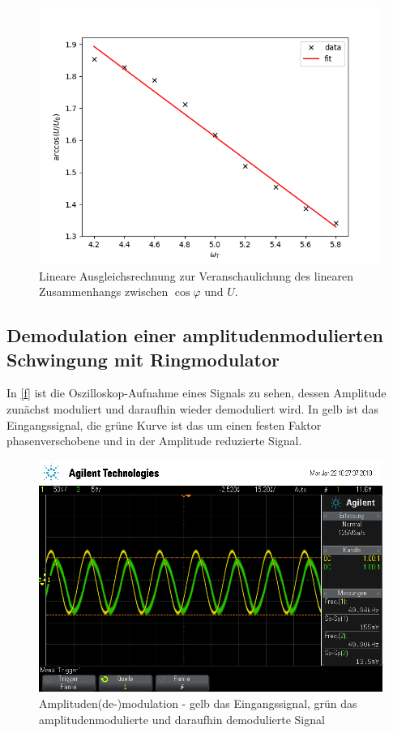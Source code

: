 \begin{figure}
	\centering
	\includegraphics[width=\textwidth]{img/linear_fit.png}
	\caption{Lineare Ausgleichsrechnung zur Veranschaulichung des linearen Zusammenhangs zwischen $\cos\varphi$ und $U$.}
	\label{fig:e}
\end{figure}

\subsection{Demodulation einer amplitudenmodulierten Schwingung mit Ringmodulator}

In \autoref{f} ist die Oszilloskop-Aufnahme eines Signals zu sehen, dessen Amplitude zunächst moduliert und daraufhin wieder demoduliert wird. In gelb ist das Eingangssignal, die grüne Kurve ist das um einen festen Faktor phasenverschobene und in der Amplitude reduzierte Signal.

\begin{figure}
	\centering
	\includegraphics[width=\textwidth]{img/f_scope_235.png}
	\caption{Amplituden(de-)modulation - gelb das Eingangssignal, grün das amplitudenmodulierte und daraufhin demodulierte Signal}
	\label{f}
\end{figure}


